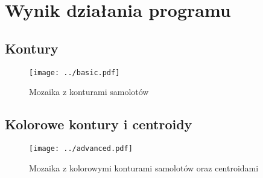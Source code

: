 \documentclass{article}
\begin{document}
\section{Wynik działania programu}

\subsection{Kontury}
\begin{figure}[H]
\begin{center}
\texttt{[image: ../basic.pdf]}
\end{center}
\caption{Mozaika z konturami samolotów}
\label{fig: wykres1}
\end{figure}

\subsection{Kolorowe kontury i centroidy}
\begin{figure}[H]
\begin{center}
\texttt{[image: ../advanced.pdf]}
\end{center}
\caption{Mozaika z kolorowymi konturami samolotów oraz centroidami}
\label{fig: wykres2}
\end{figure}
\end{document}
